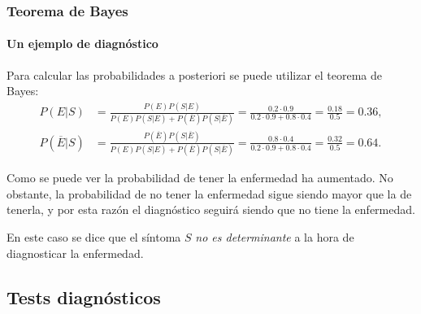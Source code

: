 \begin{frame}
\frametitle{Teorema de Bayes}
\framesubtitle{Un ejemplo de diagnóstico}
Para calcular las probabilidades a posteriori se puede utilizar el teorema de Bayes:
\begin{align*}
P(E|S) &= \frac{P(E)P(S|E)}{P(E)P(S|E)+P(\overline{E})P(S|\overline{E})} = \frac{0.2\cdot 0.9}{0.2\cdot 0.9 + 0.8\cdot 0.4} = \frac{0.18}{0.5}=0.36,\\
P(\overline{E}|S) &= \frac{P(\overline{E})P(S|\overline{E})}{P(E)P(S|E)+P(\overline{E})P(S|\overline{E})} = \frac{0.8\cdot 0.4}{0.2\cdot 0.9 + 0.8\cdot 0.4} = \frac{0.32}{0.5}=0.64.
\end{align*}

Como se puede ver la probabilidad de tener la enfermedad ha aumentado.
No obstante, la probabilidad de no tener la enfermedad sigue siendo mayor que la de tenerla, y por esta razón el diagnóstico seguirá siendo que no tiene la enfermedad.

En este caso se dice que el síntoma $S$ \emph{no es determinante} a la hora de diagnosticar la enfermedad.

\end{frame}

\subsection{Tests diagnósticos}

